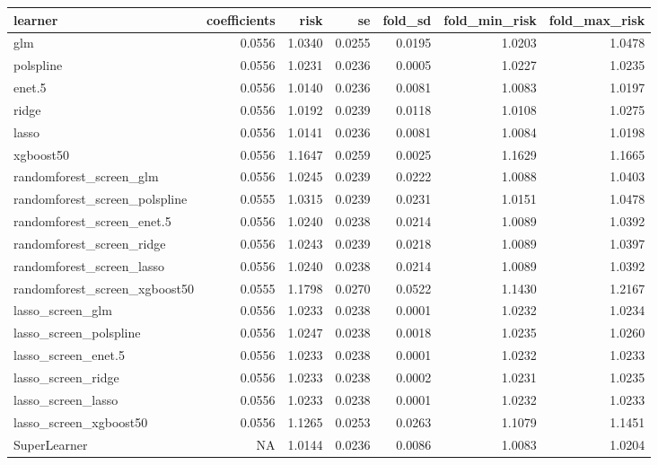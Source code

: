 \documentclass[
  12pt, krantz2,
]{krantz}
\newcommand{\1}{\mathbbm{1}}
\theoremstyle{definition}
\theoremstyle{definition}
\theoremstyle{definition}
\theoremstyle{definition}
\theoremstyle{remark}
\begin{document}
\begin{table}
\centering
\begin{tabular}{l|r|r|r|r|r|r}
\hline
learner & coefficients & risk & se & fold\_sd & fold\_min\_risk & fold\_max\_risk\\
\hline
glm & 0.0556 & 1.0340 & 0.0255 & 0.0195 & 1.0203 & 1.0478\\
\hline
polspline & 0.0556 & 1.0231 & 0.0236 & 0.0005 & 1.0227 & 1.0235\\
\hline
enet.5 & 0.0556 & 1.0140 & 0.0236 & 0.0081 & 1.0083 & 1.0197\\
\hline
ridge & 0.0556 & 1.0192 & 0.0239 & 0.0118 & 1.0108 & 1.0275\\
\hline
lasso & 0.0556 & 1.0141 & 0.0236 & 0.0081 & 1.0084 & 1.0198\\
\hline
xgboost50 & 0.0556 & 1.1647 & 0.0259 & 0.0025 & 1.1629 & 1.1665\\
\hline
randomforest\_screen\_glm & 0.0556 & 1.0245 & 0.0239 & 0.0222 & 1.0088 & 1.0403\\
\hline
randomforest\_screen\_polspline & 0.0555 & 1.0315 & 0.0239 & 0.0231 & 1.0151 & 1.0478\\
\hline
randomforest\_screen\_enet.5 & 0.0556 & 1.0240 & 0.0238 & 0.0214 & 1.0089 & 1.0392\\
\hline
randomforest\_screen\_ridge & 0.0556 & 1.0243 & 0.0239 & 0.0218 & 1.0089 & 1.0397\\
\hline
randomforest\_screen\_lasso & 0.0556 & 1.0240 & 0.0238 & 0.0214 & 1.0089 & 1.0392\\
\hline
randomforest\_screen\_xgboost50 & 0.0555 & 1.1798 & 0.0270 & 0.0522 & 1.1430 & 1.2167\\
\hline
lasso\_screen\_glm & 0.0556 & 1.0233 & 0.0238 & 0.0001 & 1.0232 & 1.0234\\
\hline
lasso\_screen\_polspline & 0.0556 & 1.0247 & 0.0238 & 0.0018 & 1.0235 & 1.0260\\
\hline
lasso\_screen\_enet.5 & 0.0556 & 1.0233 & 0.0238 & 0.0001 & 1.0232 & 1.0233\\
\hline
lasso\_screen\_ridge & 0.0556 & 1.0233 & 0.0238 & 0.0002 & 1.0231 & 1.0235\\
\hline
lasso\_screen\_lasso & 0.0556 & 1.0233 & 0.0238 & 0.0001 & 1.0232 & 1.0233\\
\hline
lasso\_screen\_xgboost50 & 0.0556 & 1.1265 & 0.0253 & 0.0263 & 1.1079 & 1.1451\\
\hline
SuperLearner & NA & 1.0144 & 0.0236 & 0.0086 & 1.0083 & 1.0204\\
\hline
\end{tabular}
\end{table}
\end{document}
